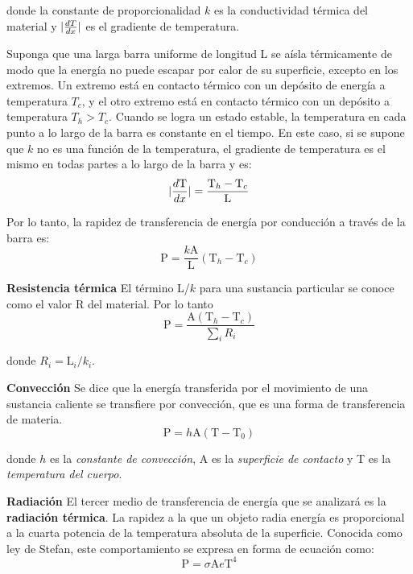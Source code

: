   \PN donde la constante de proporcionalidad $k$ es la conductividad térmica del material y $\lvert\frac{dT}{dx}\rvert$ es el
  gradiente de temperatura.

  \vspace{3mm}
  \PN Suponga que una larga barra uniforme de longitud L se aísla térmicamente de modo que la energía no puede escapar
  por calor de su superficie, excepto en los extremos. Un extremo está en contacto térmico con un depósito de energía a
  temperatura $T_{c}$, y el otro extremo está en contacto térmico con un depósito a temperatura $T_{h} > T_{c}$. Cuando
  se logra un estado estable, la temperatura en cada punto a lo largo de la barra es constante en el tiempo. En este
  caso, si se supone que $k$ no es una función de la temperatura, el gradiente de temperatura es el mismo en todas
  partes a lo largo de la barra y es:
  \begin{equation*}
    \lvert\frac{d\text{T}}{dx}\rvert = \frac{\text{T}_{h} - \text{T}_{c}}{\text{L}}
  \end{equation*}

  \PN Por lo tanto, la rapidez de transferencia de energía por conducción a través de la barra es:
  \begin{equation*}
    \text{P} = \frac{k\text{A}}{\text{L}} \left(\text{T}_{h} - \text{T}_{c}\right)
  \end{equation*}

  \PN \textbf{Resistencia térmica}
  \PN El término L/$k$ para una sustancia particular se conoce como el valor R del material. Por lo tanto
  \begin{equation*}
    \text{P} = \frac{\text{A} \left(\text{T}_{h} - \text{T}_{c}\right)}{\sum_{i} R_{i}}
  \end{equation*}

  \PN donde $R_{i} = \text{L}_{i} / k_{i}$.

  \vspace{3mm}
  \PN \textbf{Convección}
  \PN Se dice que la energía transferida por el movimiento de una sustancia caliente se transfiere por convección, que
  es una forma de transferencia de materia.
  \begin{equation*}
    \text{P} = h \text{A} \left(\text{T} - \text{T}_{0}\right)
  \end{equation*}

  \PN donde $h$ es la \textit{constante de convección}, A es la \textit{superficie de contacto} y T es la
  \textit{temperatura del cuerpo}.

  \vspace{3mm}
  \PN \textbf{Radiación}
  \PN El tercer medio de transferencia de energía que se analizará es la \textbf{radiación térmica}.
  \PN La rapidez a la que un objeto radia energía es proporcional a la cuarta potencia de la temperatura absoluta de la
  superficie. Conocida como ley de Stefan, este comportamiento se expresa en forma de ecuación como:
  \begin{equation*}
    \text{P} = \sigma \text{A} e \text{T}^{4}
  \end{equation*}

